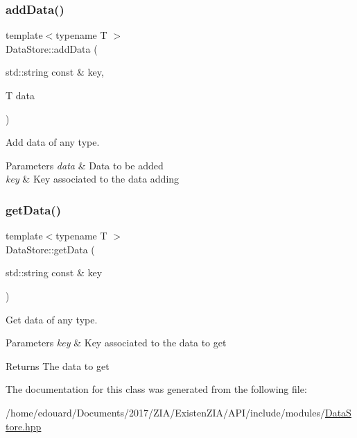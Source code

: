 \subsubsection{\texorpdfstring{add\+Data()}{addData()}}
{\footnotesize\ttfamily template$<$typename T $>$ \\
Data\+Store\+::add\+Data (\begin{DoxyParamCaption}\item[{std\+::string const \&}]{key,  }\item[{T}]{data }\end{DoxyParamCaption})\hspace{0.3cm}{\ttfamily [inline]}}



Add data of any type. 


\begin{DoxyParams}{Parameters}
{\em data} & Data to be added \\
\hline
{\em key} & Key associated to the data adding \\
\hline
\end{DoxyParams}
\mbox{\label{classxzia_1_1DataStore_a6a25b0f50250ac2793a0ed7abcabb147}} 
\subsubsection{\texorpdfstring{get\+Data()}{getData()}}
{\footnotesize\ttfamily template$<$typename T $>$ \\
Data\+Store\+::get\+Data (\begin{DoxyParamCaption}\item[{std\+::string const \&}]{key }\end{DoxyParamCaption})\hspace{0.3cm}{\ttfamily [inline]}}



Get data of any type. 


\begin{DoxyParams}{Parameters}
{\em key} & Key associated to the data to get \\
\hline
\end{DoxyParams}
\begin{DoxyReturn}{Returns}
The data to get 
\end{DoxyReturn}


The documentation for this class was generated from the following file\+:\begin{DoxyCompactItemize}
\item 
/home/edouard/\+Documents/2017/\+Z\+I\+A/\+Existen\+Z\+I\+A/\+A\+P\+I/include/modules/\mbox{\hyperlink{DataStore_8hpp}{Data\+Store.\+hpp}}\end{DoxyCompactItemize}
